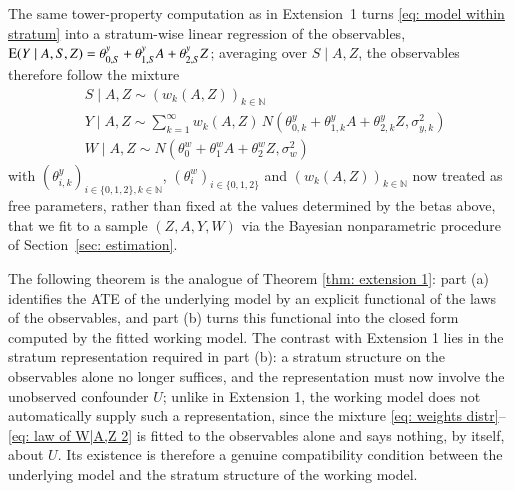 The same tower-property computation as in Extension~1 turns \eqref{eq: model within stratum} into a stratum-wise linear regression of the observables, $\mathrm{E}(Y\mid A,S,Z)=\theta_{0,S}^y+\theta_{1,S}^yA+\theta_{2,S}^yZ$; averaging over $S\mid A,Z$, the observables therefore follow the mixture
\begin{align}
    & S \mid A,Z \sim (w_k(A,Z))_{k \in \mathbb{N}} \label{eq: weights distr} \\
    &Y \mid A, Z \sim \sum_{k =1}^{\infty} w_k (A,Z) \,  N(\theta_{0,k}^{y} + \theta_{1,k}^{y} A + \theta_{2,k}^{y} Z, \sigma^2_{y,k}) \\
    & W \mid A,Z \sim N(\theta_{0}^{w} + \theta_{1}^{w} A + \theta_{2}^{w} Z, \sigma^2_{w}) \label{eq: law of W|A,Z 2}
\end{align}
with $(\theta^y_{i,k})_{i\in\{0,1,2\},k\in\mathbb{N}}$, $(\theta^w_i)_{i\in\{0,1,2\}}$ and $(w_k(A,Z))_{k\in\mathbb{N}}$ now treated as free parameters, rather than fixed at the values determined by the betas above, that we fit to a sample $(Z,A,Y,W)$ via the Bayesian nonparametric procedure of Section~\ref{sec: estimation}. 

The following theorem is the analogue of Theorem \ref{thm: extension 1}: part (a) identifies the ATE of the underlying model by an explicit functional of the laws of the observables, and part (b) turns this functional into the closed form computed by the fitted working model. The contrast with Extension 1 lies in the stratum representation required in part (b): a stratum structure on the observables alone no longer suffices, and the representation must now involve the unobserved confounder $U$; unlike in Extension 1, the working model does not automatically supply such a representation, since the mixture \eqref{eq: weights distr}--\eqref{eq: law of W|A,Z 2} is fitted to the observables alone and says nothing, by itself, about $U$. Its existence is therefore a genuine compatibility condition between the underlying model and the stratum structure of the working model.

